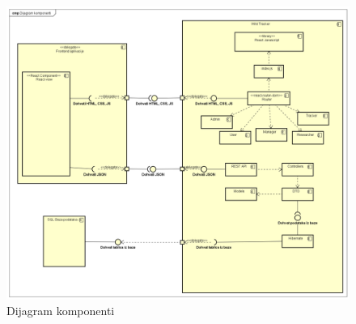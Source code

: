 			\begin{figure}[H]
				\includegraphics[scale=0.4]{slike/dijagram_komponenti.PNG} %
				\centering
				\caption{Dijagram komponenti}
				\label{fig:promjene}
			\end{figure}